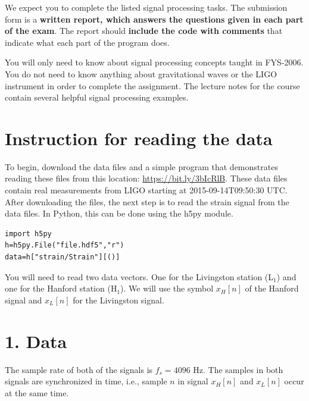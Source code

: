 We expect you to complete the listed signal processing tasks. The
submission form is a \textbf{written report, which answers the
  questions given in each part of the exam}. The report should
\textbf{include the code with comments} that indicate what each part
of the program does.


You will only need to know about signal processing concepts taught in
FYS-2006. You do not need to know anything about gravitational waves
or the LIGO instrument in order to complete the assignment. The
lecture notes for the course contain several helpful signal processing
examples. 


\section{Instruction for reading the data}

To begin, download the data files and a simple program that
demonstrates reading these files from this location:
\url{https://bit.ly/3bIcRlB}. These data files contain real
measurements from LIGO starting at 2015-09-14T09:50:30 UTC. After
downloading the files, the next step is to read the strain signal from
the data files. In Python, this can be done using the h5py module.
\begin{verbatim}
import h5py
h=h5py.File("file.hdf5","r")
data=h["strain/Strain"][()]
\end{verbatim}
You will need to read two data vectors. One for the Livingston station
(L$_1$) and one for the Hanford station (H$_1$). We will use the symbol $x_H[n]$
of the Hanford signal and $x_L[n]$ for the Livingston signal.

\section{1. Data}
The sample rate of both of the signals is $f_s=4096$ Hz. The samples
in both signals are synchronized in time, i.e., sample $n$ in signal
$x_H[n]$ and $x_L[n]$ occur at the same time.

